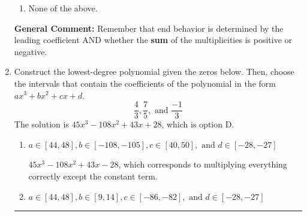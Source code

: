 \documentclass{extbook}[14pt]
\newcommand{\litem}[1]{\item #1

\rule{\textwidth}{0.4pt}}
\begin{document}
\begin{enumerate}
{\begin{enumerate}[label=\Alph*.]
\item None of the above.\end{enumerate}
\textbf{General Comment:} Remember that end behavior is determined by the leading coefficient AND whether the \textbf{sum} of the multiplicities is positive or negative.
}
\litem{
Construct the lowest-degree polynomial given the zeros below. Then, choose the intervals that contain the coefficients of the polynomial in the form $ax^3+bx^2+cx+d$.
\[ \frac{4}{3}, \frac{7}{5}, \text{ and } \frac{-1}{3} \]The solution is \( 45x^{3} -108 x^{2} +43 x + 28 \), which is option D.\begin{enumerate}[label=\Alph*.]
\item \( a \in [44, 48], b \in [-108, -105], c \in [40, 50], \text{ and } d \in [-28, -27] \)

$45x^{3} -108 x^{2} +43 x -28$, which corresponds to multiplying everything correctly except the constant term.
\item \( a \in [44, 48], b \in [9, 14], c \in [-86, -82], \text{ and } d \in [-28, -27] \)


\end{enumerate}}
\end{enumerate}
\end{document}
